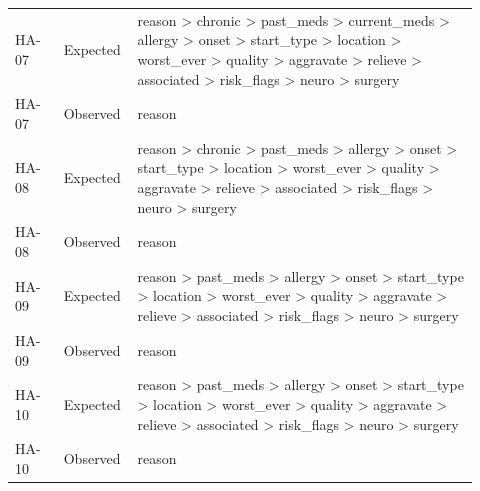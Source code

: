 \begin{longtable}{>{\raggedright\arraybackslash}p{0.1\linewidth}>{\raggedright\arraybackslash}p{0.12\linewidth}>{\raggedright\arraybackslash}p{0.7\linewidth}}
HA-\allowbreak{}07 & Expected & reason > chronic > past\_\allowbreak{}meds > current\_\allowbreak{}meds > allergy > onset > start\_\allowbreak{}type > location > worst\_\allowbreak{}ever > quality > aggravate > relieve > associated > risk\_\allowbreak{}flags > neuro > surgery \\
HA-\allowbreak{}07 & Observed & reason \\
HA-\allowbreak{}08 & Expected & reason > chronic > past\_\allowbreak{}meds > allergy > onset > start\_\allowbreak{}type > location > worst\_\allowbreak{}ever > quality > aggravate > relieve > associated > risk\_\allowbreak{}flags > neuro > surgery \\
HA-\allowbreak{}08 & Observed & reason \\
HA-\allowbreak{}09 & Expected & reason > past\_\allowbreak{}meds > allergy > onset > start\_\allowbreak{}type > location > worst\_\allowbreak{}ever > quality > aggravate > relieve > associated > risk\_\allowbreak{}flags > neuro > surgery \\
HA-\allowbreak{}09 & Observed & reason \\
HA-\allowbreak{}10 & Expected & reason > past\_\allowbreak{}meds > allergy > onset > start\_\allowbreak{}type > location > worst\_\allowbreak{}ever > quality > aggravate > relieve > associated > risk\_\allowbreak{}flags > neuro > surgery \\
HA-\allowbreak{}10 & Observed & reason \\
\end{longtable}\endgroup
